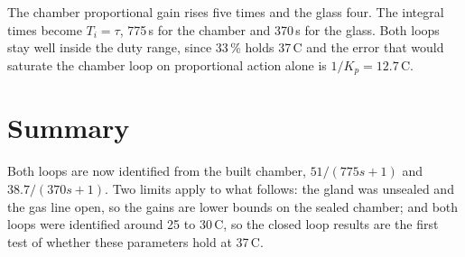 The chamber proportional gain rises five times and the glass four. The integral times become $T_i = \tau$, 775\,s for the chamber and 370\,s for the glass. Both loops stay well inside the duty range, since 33\,\% holds 37\,\textdegree{}C and the error that would saturate the chamber loop on proportional action alone is $1/K_p = 12.7$\,\textdegree{}C.

\section{Summary}
\label{sec:sysid-summary}

Both loops are now identified from the built chamber, $51/(775s+1)$ and $38.7/(370s+1)$. Two limits apply to what follows: the gland was unsealed and the gas line open, so the gains are lower bounds on the sealed chamber; and both loops were identified around 25 to 30\,\textdegree{}C, so the closed loop results are the first test of whether these parameters hold at 37\,\textdegree{}C.

